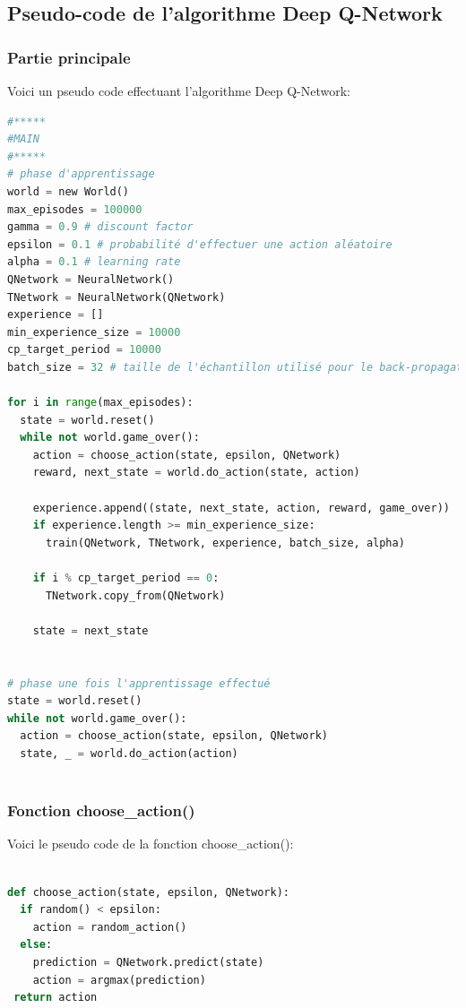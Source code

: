\documentclass[11pt,a4paper]{report}
\begin{document}
   \subsection{Pseudo-code de l'algorithme Deep Q-Network} 
   
   \subsubsection{Partie principale}
   
   \par Voici un pseudo code effectuant l'algorithme Deep Q-Network: 
   
   \begin{lstlisting}[language=python]
#*****
#MAIN
#*****
# phase d'apprentissage
world = new World()
max_episodes = 100000
gamma = 0.9 # discount factor
epsilon = 0.1 # probabilité d'effectuer une action aléatoire
alpha = 0.1 # learning rate
QNetwork = NeuralNetwork()
TNetwork = NeuralNetwork(QNetwork)
experience = []
min_experience_size = 10000
cp_target_period = 10000
batch_size = 32 # taille de l'échantillon utilisé pour le back-propagation
  
for i in range(max_episodes):
  state = world.reset()
  while not world.game_over():
    action = choose_action(state, epsilon, QNetwork)
    reward, next_state = world.do_action(state, action)

    experience.append((state, next_state, action, reward, game_over)) 
    if experience.length >= min_experience_size:
      train(QNetwork, TNetwork, experience, batch_size, alpha)

    if i % cp_target_period == 0:
      TNetwork.copy_from(QNetwork)
        
    state = next_state
    
        
# phase une fois l'apprentissage effectué
state = world.reset()
while not world.game_over():
  action = choose_action(state, epsilon, QNetwork)
  state, _ = world.do_action(action)
        
  \end{lstlisting} 

   \newpage
   \subsubsection{Fonction choose\_action()}

   \par Voici le pseudo code de la fonction choose\_action():  
  
  \begin{lstlisting}[language=python]
  
def choose_action(state, epsilon, QNetwork):
  if random() < epsilon:
    action = random_action()
  else:
    prediction = QNetwork.predict(state)
    action = argmax(prediction)
 return action
 
  \end{lstlisting} 
  
\end{document}
